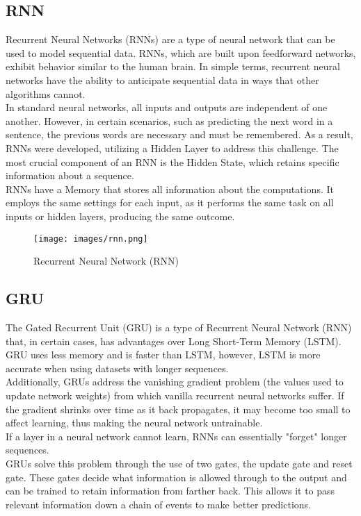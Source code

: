 \documentclass{ieeeojies}
\begin{document}
\subsection{RNN}
\indent Recurrent Neural Networks (RNNs) \cite{b14} are a type of neural network that can be used to model sequential data. RNNs, which are built upon feedforward networks, exhibit behavior similar to the human brain. In simple terms, recurrent neural networks have the ability to anticipate sequential data in ways that other algorithms cannot.
\\
\indent In standard neural networks, all inputs and outputs are independent of one another. However, in certain scenarios, such as predicting the next word in a sentence, the previous words are necessary and must be remembered. As a result, RNNs were developed, utilizing a Hidden Layer to address this challenge. The most crucial component of an RNN is the Hidden State, which retains specific information about a sequence.
\\
\indent RNNs have a Memory that stores all information about the computations. It employs the same settings for each input, as it performs the same task on all inputs or hidden layers, producing the same outcome. \cite{b14}

\begin{figure}[H]
    \centering
    \begin{minipage}{0.28\textwidth}
    \centering
    \texttt{[image: images/rnn.png]}
    \caption{Recurrent Neural Network (RNN)}
    \label{fig:1}
    \end{minipage}
\end{figure}

\subsection{GRU}
\indent The Gated Recurrent Unit (GRU) \cite{b15} is a type of Recurrent Neural Network (RNN) that, in certain cases, has advantages over Long Short-Term Memory (LSTM). GRU uses less memory and is faster than LSTM, however, LSTM is more accurate when using datasets with longer sequences.
\\
\indent Additionally, GRUs address the vanishing gradient problem (the values used to update network weights) from which vanilla recurrent neural networks suffer. If the gradient shrinks over time as it back propagates, it may become too small to affect learning, thus making the neural network untrainable.
\\
\indent If a layer in a neural network cannot learn, RNNs can essentially "forget" longer sequences.
\\
\indent GRUs solve this problem through the use of two gates, the update gate and reset gate. These gates decide what information is allowed through to the output and can be trained to retain information from farther back. This allows it to pass relevant information down a chain of events to make better predictions.
\end{document}
